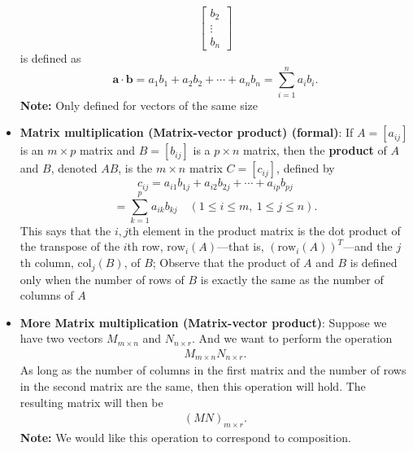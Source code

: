 \documentclass{report}
\begin{document}
\begin{itemize}
\[\begin{bmatrix}
                        b_2 \\
                        \vdots \\
                        b_n
                    \end{bmatrix}
                \]
                is defined as
                \[
                    \mathbf{a} \cdot \mathbf{b} = a_1b_1 + a_2b_2 + \cdots + a_nb_n = \sum_{i=1}^{n} a_i b_i.
                \]
                \bigbreak \noindent 
                \textbf{Note:} Only defined for vectors of the same size
            \item \textbf{Matrix multiplication (Matrix-vector product) (formal)}:
                If $A = [a_{ij}]$ is an $m \times p$ matrix and $B = [b_{ij}]$ is a $p \times n$ matrix, then the \textbf{product} of $A$ and $B$, denoted $AB$, is the $m \times n$ matrix $C = [c_{ij}]$, defined by
                \[
                    c_{ij} = a_{i1}b_{1j} + a_{i2}b_{2j} + \cdots + a_{ip}b_{pj}
                \]
                \[
                    = \sum_{k=1}^{p} a_{ik}b_{kj} \quad (1 \leq i \leq m, \ 1 \leq j \leq n).
                \]
                \bigbreak \noindent 
                This says that the \(i,j\)th element in the product matrix is the dot product of the transpose of the \(i\)th row, \(\text{row}_i(A)\)—that is, \((\text{row}_i(A))^T\)—and the \(j\)th column, \(\text{col}_j(B)\), of \(B\); 
                \bigbreak \noindent 
                \bigbreak \noindent 
                Observe that the product of $A$ and $B$ is defined only when the number of rows of $B$ is exactly the same as the number of columns of $A$
            \item \textbf{More Matrix multiplication (Matrix-vector product)}: Suppose we have two vectors $M_{m\times n}$ and $N_{n\times r} $. And we want to perform the operation 
                \begin{align*}
                    M_{m\times n}N_{n\times r}
                .\end{align*}
                As long as the number of columns in the first matrix and the number of rows in the second matrix are the same, then this operation will hold. The resulting matrix will then be
                \begin{align*}
                    (MN)_{m \times r}
                .\end{align*}
                \textbf{Note:} We would like this operation to correspond to composition. 
                \bigbreak \noindent 

\end{itemize}
\end{document}
